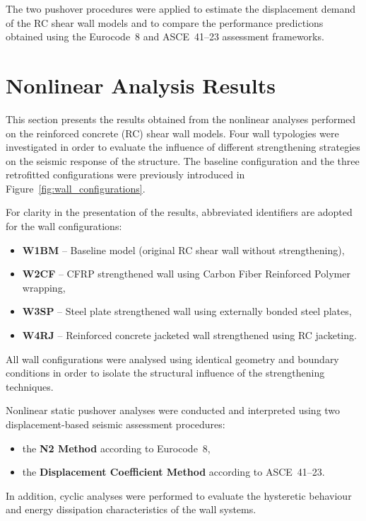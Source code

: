 \documentclass[fleqn,10pt]{wlscirep}
\begin{document}
The two pushover procedures were applied to estimate the displacement demand of the RC shear wall models and to compare the performance predictions obtained using the Eurocode~8 and ASCE~41--23 assessment frameworks.

\section{Nonlinear Analysis Results}

This section presents the results obtained from the nonlinear analyses performed on the reinforced concrete (RC) shear wall models. 
Four wall typologies were investigated in order to evaluate the influence of different strengthening strategies on the seismic response of the structure. 
The baseline configuration and the three retrofitted configurations were previously introduced in Figure~\ref{fig:wall_configurations}. 

For clarity in the presentation of the results, abbreviated identifiers are adopted for the wall configurations:

\begin{itemize}
\item \textbf{W1BM} -- Baseline model (original RC shear wall without strengthening),
\item \textbf{W2CF} -- CFRP strengthened wall using Carbon Fiber Reinforced Polymer wrapping,
\item \textbf{W3SP} -- Steel plate strengthened wall using externally bonded steel plates,
\item \textbf{W4RJ} -- Reinforced concrete jacketed wall strengthened using RC jacketing.
\end{itemize}

All wall configurations were analysed using identical geometry and boundary conditions in order to isolate the structural influence of the strengthening techniques.

Nonlinear static pushover analyses were conducted and interpreted using two displacement-based seismic assessment procedures:

\begin{itemize}
\item the \textbf{N2 Method} according to Eurocode~8,
\item the \textbf{Displacement Coefficient Method} according to ASCE~41--23.
\end{itemize}

In addition, cyclic analyses were performed to evaluate the hysteretic behaviour and energy dissipation characteristics of the wall systems.
\end{document}
